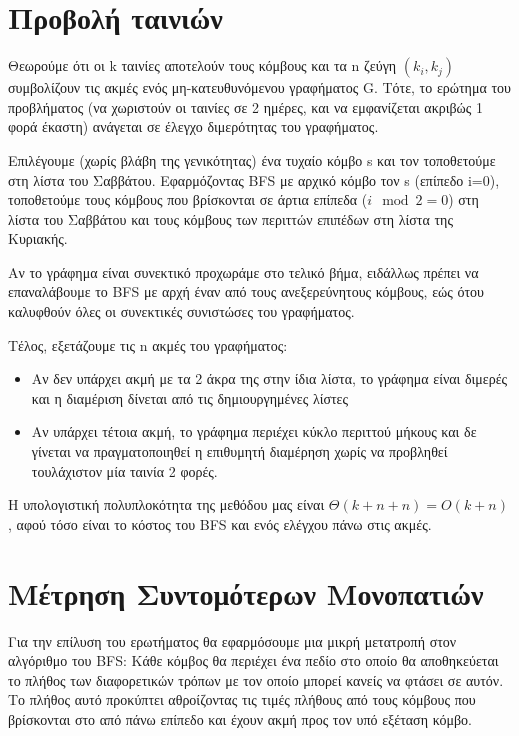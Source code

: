 \documentclass[a4paper,11pt]{article}
\begin{document}
\renewcommand{\labelenumi}{\roman{enumi})}
\renewcommand{\labelenumii}{ (\arabic{enumii}) }



\section{Προβολή ταινιών} \setcounter{section}{1}
Θεωρούμε ότι οι k ταινίες αποτελούν τους κόμβους και τα n ζεύγη $(k_i, k_j)$
συμβολίζουν τις ακμές ενός μη-κατευθυνόμενου γραφήματος G. Τότε, το ερώτημα
του προβλήματος (να χωριστούν οι ταινίες σε 2 ημέρες, και να εμφανίζεται
ακριβώς 1 φορά έκαστη) ανάγεται σε έλεγχο διμερότητας του γραφήματος.

Επιλέγουμε (χωρίς βλάβη της γενικότητας) ένα τυχαίο κόμβο s και τον τοποθετούμε
στη λίστα του Σαββάτου. Εφαρμόζοντας BFS με αρχικό κόμβο τον s (επίπεδο i=0),
τοποθετούμε τους κόμβους που βρίσκονται σε άρτια επίπεδα ($i \mod 2 = 0$)
στη λίστα του Σαββάτου και τους κόμβους των περιττών επιπέδων στη λίστα της
Κυριακής.

Αν το γράφημα είναι συνεκτικό προχωράμε στο τελικό βήμα, ειδάλλως πρέπει να
επαναλάβουμε το BFS με αρχή έναν από τους ανεξερεύνητους κόμβους, εώς ότου
καλυφθούν όλες οι συνεκτικές συνιστώσες του γραφήματος.

Τέλος, εξετάζουμε τις n ακμές του γραφήματος:
\begin{itemize}
    \item Αν δεν υπάρχει ακμή με τα 2 άκρα της στην ίδια λίστα, το γράφημα
    είναι διμερές και η διαμέριση δίνεται από τις δημιουργημένες λίστες
    \item Αν υπάρχει τέτοια ακμή, το γράφημα περιέχει κύκλο περιττού μήκους
    και δε γίνεται να πραγματοποιηθεί η επιθυμητή διαμέρηση χωρίς να προβληθεί
    τουλάχιστον μία ταινία 2 φορές.
\end{itemize}

Η υπολογιστική πολυπλοκότητα της μεθόδου μας είναι $\Theta(k + n + n) =
O(k + n)$, αφού τόσο είναι το κόστος του BFS και ενός ελέγχου πάνω στις
ακμές.


\section{Μέτρηση Συντομότερων Μονοπατιών}
Για την επίλυση του ερωτήματος θα εφαρμόσουμε μια μικρή μετατροπή στον
αλγόριθμο του BFS: Κάθε κόμβος θα περιέχει ένα πεδίο στο οποίο θα αποθηκεύεται
το πλήθος των διαφορετικών τρόπων με τον οποίο μπορεί κανείς να φτάσει σε
αυτόν. Το πλήθος αυτό προκύπτει αθροίζοντας τις τιμές πλήθους από τους κόμβους
που βρίσκονται στο από πάνω επίπεδο και έχουν ακμή προς τον υπό εξέταση κόμβο.
\end{document}
